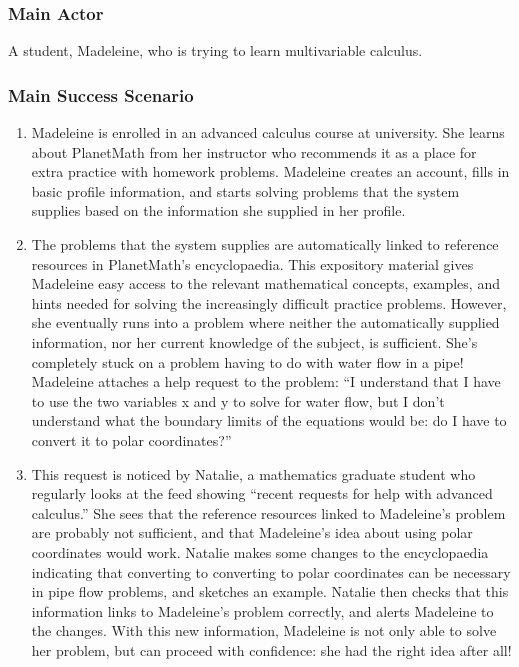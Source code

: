 \subsubsection{Main Actor}

A student, Madeleine, who is trying to learn multivariable calculus.

\subsubsection{Main Success Scenario}

\begin{enumerate}
\item
  Madeleine is enrolled in an advanced calculus course at university.
  She learns about PlanetMath from her instructor who recommends it as a
  place for extra practice with homework problems. Madeleine creates an
  account, fills in basic profile information, and starts solving
  problems that the system supplies based on the information she
  supplied in her profile.
\item
  The problems that the system supplies are automatically linked to
  reference resources in PlanetMath's encyclopaedia. This expository
  material gives Madeleine easy access to the relevant mathematical
  concepts, examples, and hints needed for solving the increasingly
  difficult practice problems. However, she eventually runs into a
  problem where neither the automatically supplied information, nor her
  current knowledge of the subject, is sufficient. She's completely
  stuck on a problem having to do with water flow in a pipe! Madeleine
  attaches a help request to the problem: ``I understand that I have to
  use the two variables x and y to solve for water flow, but I don't
  understand what the boundary limits of the equations would be: do I
  have to convert it to polar coordinates?''
\item
  This request is noticed by Natalie, a mathematics graduate student who
  regularly looks at the feed showing ``recent requests for help with
  advanced calculus.'' She sees that the reference resources linked to
  Madeleine's problem are probably not sufficient, and that Madeleine's
  idea about using polar coordinates would work. Natalie makes some
  changes to the encyclopaedia indicating that converting to converting
  to polar coordinates can be necessary in pipe flow problems, and
  sketches an example. Natalie then checks that this information links
  to Madeleine's problem correctly, and alerts Madeleine to the changes.
  With this new information, Madeleine is not only able to solve her
  problem, but can proceed with confidence: she had the right idea after
  all!
\end{enumerate}
